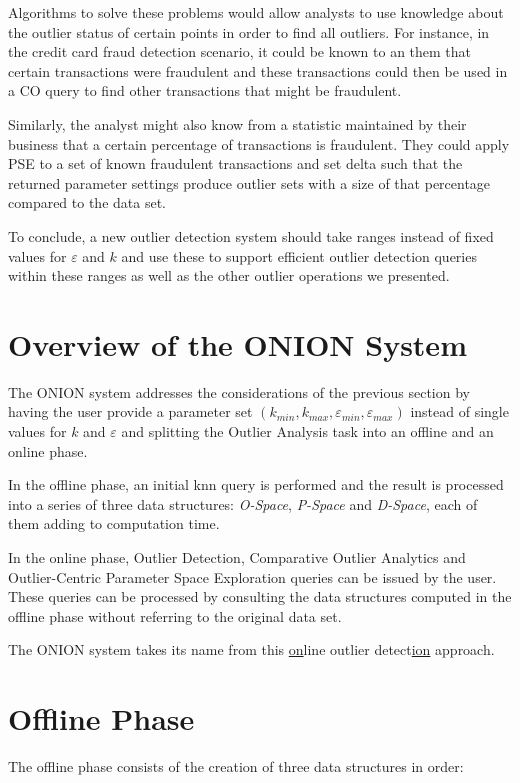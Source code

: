 \documentclass[runningheads]{llncs}
\begin{document}
Algorithms to solve these problems would allow analysts to use knowledge about the outlier status of certain points in order to find all outliers. For instance, in the credit card fraud detection scenario, it could be known to an them that certain transactions were fraudulent and these transactions could then be used in a CO query to find other transactions that might be fraudulent.

Similarly, the analyst might also know from a statistic maintained by their business that a certain percentage of transactions is fraudulent. They could apply PSE to a set of known fraudulent transactions and set delta such that the returned parameter settings produce outlier sets with a size of that percentage compared to the data set.

To conclude, a new outlier detection system should take ranges instead of fixed values for $\varepsilon$ and $k$ and use these to support efficient outlier detection queries within these ranges as well as the other outlier operations we presented.
\section{Overview of the ONION System}
The ONION system addresses the considerations of the previous section by having the user provide a parameter set $(k_{min},k_{max},\varepsilon_{min},\varepsilon_{max})$ instead of single values for $k$ and $\varepsilon$ and splitting the Outlier Analysis task into an offline and an online phase.

In the offline phase, an initial knn query is performed and the result is processed into a series of three data structures: \emph{O-Space}, \emph{P-Space} and \emph{D-Space}, each of them adding to computation time.

In the online phase, Outlier Detection, Comparative Outlier Analytics and Outlier-Centric Parameter Space Exploration queries can be issued by the user. These queries can be processed by consulting the data structures computed in the offline phase without referring to the original data set.

The ONION system takes its name from this \underline{on}line outlier detect\underline{ion} approach.

\section{Offline Phase}

The offline phase consists of the creation of three data structures in order:
\end{document}
